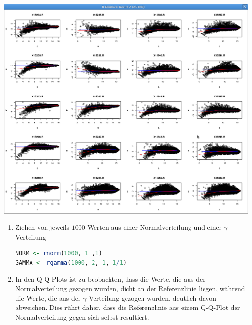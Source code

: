 \documentclass{homework}
\begin{document}
\begin{enumerate}
\includegraphics[scale=0.3]{data/aufg_37}


\begin{enumerate}
\item Ziehen von jeweils $1000$ Werten aus einer Normalverteilung und einer $\gamma$-Verteilung:
\begin{lstlisting}[language=r]
NORM <- rnorm(1000, 1 ,1)
GAMMA <- rgamma(1000, 2, 1, 1/1)
\end{lstlisting}
\item In den Q-Q-Plots ist zu beobachten, dass die Werte, die aus der Normalverteilung gezogen wurden,
dicht an der Referenzlinie liegen, während die Werte, die aus der $\gamma$-Verteilung gezogen wurden,
deutlich davon abweichen. Dies rührt daher, dass die Referenzlinie aus einem Q-Q-Plot der Normalverteilung gegen sich selbst resultiert. 


\end{enumerate}
\end{enumerate}
\end{document}
